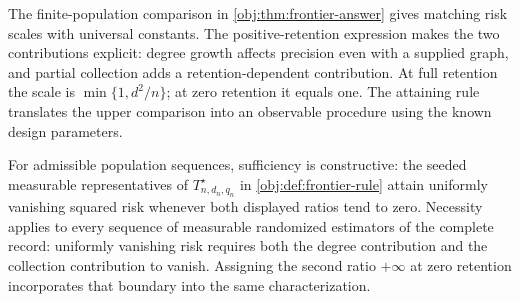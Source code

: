 The finite-population comparison in \cref{obj:thm:frontier-answer} gives matching risk scales with universal constants. The positive-retention expression makes the two contributions explicit: degree growth affects precision even with a supplied graph, and partial collection adds a retention-dependent contribution. At full retention the scale is \(\min\{1,d^2/n\}\); at zero retention it equals one. The attaining rule translates the upper comparison into an observable procedure using the known design parameters.

For admissible population sequences, sufficiency is constructive: the seeded measurable representatives of \(T^\star_{n,d_n,q_n}\) in \cref{obj:def:frontier-rule} attain uniformly vanishing squared risk whenever both displayed ratios tend to zero. Necessity applies to every sequence of measurable randomized estimators of the complete record: uniformly vanishing risk requires both the degree contribution and the collection contribution to vanish. Assigning the second ratio \(+\infty\) at zero retention incorporates that boundary into the same characterization.
